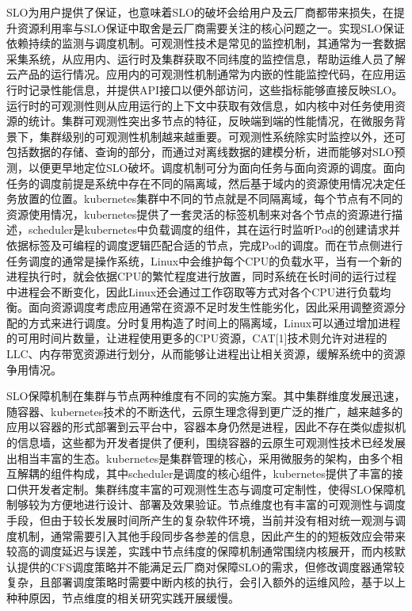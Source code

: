 SLO为用户提供了保证，也意味着SLO的破坏会给用户及云厂商都带来损失，在提升资源利用率与SLO保证中取舍是云厂商需要关注的核心问题之一。实现SLO保证依赖持续的监测与调度机制。可观测性技术是常见的监控机制，其通常为一套数据采集系统，从应用内、运行时及集群获取不同纬度的监控信息，帮助运维人员了解云产品的运行情况。应用内的可观测性机制通常为内嵌的性能监控代码，在应用运行时记录性能信息，并提供API接口以便外部访问，这些指标能够直接反映SLO。运行时的可观测性则从应用运行的上下文中获取有效信息，如内核中对任务使用资源的统计。集群可观测性突出多节点的特征，反映端到端的性能情况，在微服务背景下，集群级别的可观测性机制越来越重要。可观测性系统除实时监控以外，还可包括数据的存储、查询的部分，而通过对离线数据的建模分析，进而能够对SLO预测，以便更早地定位SLO破坏。调度机制可分为面向任务与面向资源的调度。面向任务的调度前提是系统中存在不同的隔离域，然后基于域内的资源使用情况决定任务放置的位置。kubernetes集群中不同的节点就是不同隔离域，每个节点有不同的资源使用情况，kubernetes提供了一套灵活的标签机制来对各个节点的资源进行描述，scheduler是kubernetes中负载调度的组件，其在运行时监听Pod的创建请求并依据标签及可编程的调度逻辑匹配合适的节点，完成Pod的调度。而在节点侧进行任务调度的通常是操作系统，Linux中会维护每个CPU的负载水平，当有一个新的进程执行时，就会依据CPU的繁忙程度进行放置，同时系统在长时间的运行过程中进程会不断变化，因此Linux还会通过工作窃取等方式对各个CPU进行负载均衡。面向资源调度考虑应用通常在资源不足时发生性能劣化，因此采用调整资源分配的方式来进行调度。分时复用构造了时间上的隔离域，Linux可以通过增加进程的可用时间片数量，让进程使用更多的CPU资源，CAT[1]技术则允许对进程的LLC、内存带宽资源进行划分，从而能够让进程出让相关资源，缓解系统中的资源争用情况。

SLO保障机制在集群与节点两种维度有不同的实施方案。其中集群维度发展迅速，随容器、kubernetes技术的不断迭代，云原生理念得到更广泛的推广，越来越多的应用以容器的形式部署到云平台中，容器本身仍然是进程，因此不存在类似虚拟机的信息墙，这些都为开发者提供了便利，围绕容器的云原生可观测性技术已经发展出相当丰富的生态。kubernetes是集群管理的核心，采用微服务的架构，由多个相互解耦的组件构成，其中scheduler是调度的核心组件，kubernetes提供了丰富的接口供开发者定制。集群纬度丰富的可观测性生态与调度可定制性，使得SLO保障机制够较为方便地进行设计、部署及效果验证。节点维度也有丰富的可观测性与调度手段，但由于较长发展时间所产生的复杂软件环境，当前并没有相对统一观测与调度机制，通常需要引入其他手段同步各参差的信息，因此产生的的短板效应会带来较高的调度延迟与误差，实践中节点纬度的保障机制通常围绕内核展开，而内核默认提供的CFS调度策略并不能满足云厂商对保障SLO的需求，但修改调度器通常较复杂，且部署调度策略时需要中断内核的执行，会引入额外的运维风险，基于以上种种原因，节点维度的相关研究实践开展缓慢。

